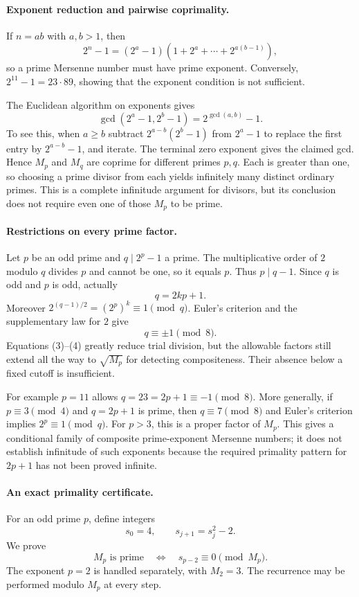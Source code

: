 \documentclass[11pt]{article}
\begin{document}
\paragraph{Exponent reduction and pairwise coprimality.}
If $n=ab$ with $a,b>1$, then
\[
 2^n-1=(2^a-1)(1+2^a+\cdots+2^{a(b-1)}),                \tag{1}
\]
so a prime Mersenne number must have prime exponent. Conversely,
$2^{11}-1=23\cdot89$, showing that the exponent condition is not
sufficient.

The Euclidean algorithm on exponents gives
\[
              \gcd(2^a-1,2^b-1)=2^{\gcd(a,b)}-1.        \tag{2}
\]
To see this, when $a\ge b$ subtract $2^{a-b}(2^b-1)$ from
$2^a-1$ to replace the first entry by $2^{a-b}-1$, and iterate.
The terminal zero exponent gives the claimed gcd. Hence $M_p$ and
$M_q$ are coprime for different primes $p,q$.
Each is greater than one, so choosing a prime divisor from each yields
infinitely many distinct ordinary primes. This is a complete infinitude
argument for divisors, but its conclusion does not require even one
of those $M_p$ to be prime.

\paragraph{Restrictions on every prime factor.}
Let $p$ be an odd prime and $q\mid2^p-1$ a prime. The multiplicative
order of $2$ modulo $q$ divides $p$ and cannot be one, so it equals $p$.
Thus $p\mid q-1$. Since $q$ is odd and $p$ is odd, actually
\[
                              q=2kp+1.                  \tag{3}
\]
Moreover $2^{(q-1)/2}=(2^p)^k\equiv1\pmod q$.
Euler's criterion and the supplementary law for $2$ give
\[
                              q\equiv\pm1\pmod8.        \tag{4}
\]
Equations (3)--(4) greatly reduce trial division, but the allowable
factors still extend all the way to $\sqrt{M_p}$ for detecting
compositeness. Their absence below a fixed cutoff is insufficient.

For example $p=11$ allows $q=23=2p+1\equiv-1\pmod8$.
More generally, if $p\equiv3\pmod4$ and $q=2p+1$ is prime, then
$q\equiv7\pmod8$ and Euler's criterion implies
$2^p\equiv1\pmod q$. For $p>3$, this is a proper factor of $M_p$.
This gives a conditional family of composite prime-exponent Mersenne
numbers; it does not establish infinitude of such exponents because
the required primality pattern for $2p+1$ has not been proved infinite.

\paragraph{An exact primality certificate.}
For an odd prime $p$, define integers
\[
                 s_0=4,\qquad s_{j+1}=s_j^2-2.
\]
We prove
\[
            M_p\text{ is prime}\quad\Longleftrightarrow\quad
                           s_{p-2}\equiv0\pmod{M_p}.    \tag{5}
\]
The exponent $p=2$ is handled separately, with $M_2=3$.
The recurrence may be performed modulo $M_p$ at every step.
\end{document}
